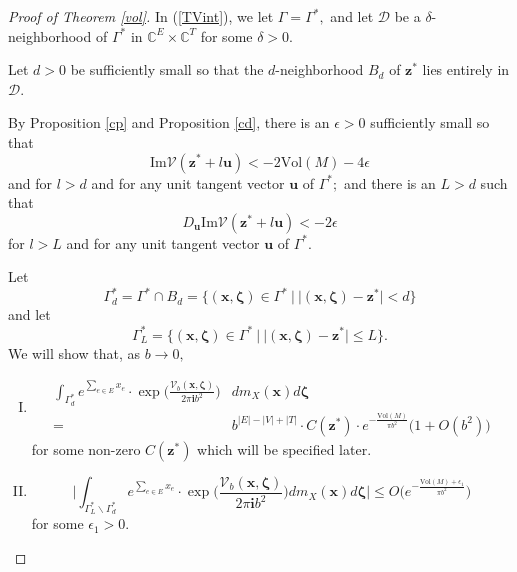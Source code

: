 \documentclass[11pt]{article}
\renewcommand{\setminus}{{\smallsetminus}}
\theoremstyle{remark}
\theoremstyle{remark}
\numberwithin{equation}{section}
\begin{document}
\begin{proof}[Proof of Theorem \ref{vol}] 
In (\ref{TVint}), we let $\Gamma = \Gamma^*,$ and let $\mathcal D$ be a $\delta$-neighborhood of $\Gamma^*$ in $\mathbb C^E\times \mathbb C^T$ for some $\delta>0.$ 

Let  $d>0$ be sufficiently small so that the $d$-neighborhood $B_{d}$ of $\boldsymbol z^*$ 
 lies entirely in $\mathcal D.$ 







By Proposition \ref{cp} and Proposition \ref{cd},  there is an $\epsilon>0$ sufficiently small so that 
 \begin{equation}\label{ImV}
\mathrm{Im} \mathcal V(\boldsymbol z^* + l\mathbf u )< -2\mathrm{Vol}(M)-4\epsilon
\end{equation}
and for $l>d$ and for any unit tangent vector $\mathbf u$ of $\Gamma^*;$ and there is an $L>d$ such that 
\begin{equation}\label{Dv11}
 D_{\mathbf u} \mathrm{Im} \mathcal V(\boldsymbol z^*+ l\mathbf u)<-2\epsilon
\end{equation}
for $l>L$ and for any unit tangent vector $\mathbf u$ of $\Gamma^*.$  


Let
$$\Gamma^*_d=\Gamma^*\cap B_d=\Big\{ (\boldsymbol x,\boldsymbol \zeta) \in \Gamma^*\ \Big|\ \big| (\boldsymbol x,\boldsymbol \zeta)-\boldsymbol z^* \big|<d\Big\}$$
and let 
$$\Gamma^*_L=\Big\{ (\boldsymbol x,\boldsymbol \zeta) \in \Gamma^*\ \Big|\ \big| (\boldsymbol x,\boldsymbol \zeta)-\boldsymbol z^* \big|\leqslant L\Big\}.$$
We will show that, as $b\to 0,$
\begin{enumerate}[(I)]
\item  
\begin{equation*}
\begin{split}
    \int_{\Gamma^*_d} e^{\sum_{e\in E}x_e}\cdot\exp\bigg(\frac{\mathcal V_b(\boldsymbol x, \boldsymbol \zeta)}{2\pi \mathbf i b^2}\bigg)&dm_X(\boldsymbol x)  d \boldsymbol \zeta\\
= & b^{|E|-|V|+|T|}\cdot C(\boldsymbol z^*)\cdot  e^{-\frac{\mathrm{Vol}(M)}{\pi b^2}}\big(1+O(b^2)\big)
\end{split}
\end{equation*}
for some non-zero $C(\boldsymbol z^*)$ which will be specified later.



\item 
$$
\bigg|\int_{\Gamma^*_L\setminus \Gamma^*_d} e^{\sum_{e\in E}x_e}\cdot\exp\bigg(\frac{\mathcal V_b(\boldsymbol x, \boldsymbol \zeta)}{2\pi \mathbf i b^2}\bigg)dm_X(\boldsymbol x)  d \boldsymbol \zeta\bigg|\leqslant  O\bigg( e^{-\frac{\mathrm{Vol}(M)+\epsilon_1}{\pi b^2}}\bigg)
$$
for some $\epsilon_1>0.$ 




\end{enumerate}
\end{proof}
\end{document}
